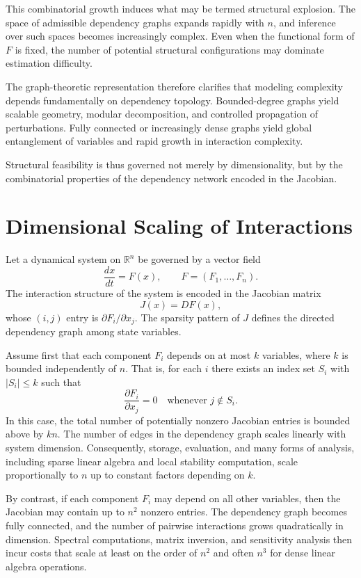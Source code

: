 \documentclass[12pt]{book}
\begin{document}
This combinatorial growth induces what may be termed structural explosion. The space of admissible dependency graphs expands rapidly with $n$, and inference over such spaces becomes increasingly complex. Even when the functional form of $F$ is fixed, the number of potential structural configurations may dominate estimation difficulty.

The graph-theoretic representation therefore clarifies that modeling complexity depends fundamentally on dependency topology. Bounded-degree graphs yield scalable geometry, modular decomposition, and controlled propagation of perturbations. Fully connected or increasingly dense graphs yield global entanglement of variables and rapid growth in interaction complexity.

Structural feasibility is thus governed not merely by dimensionality, but by the combinatorial properties of the dependency network encoded in the Jacobian.

\section{Dimensional Scaling of Interactions}

Let a dynamical system on $\mathbb{R}^n$ be governed by a vector field
\[
\frac{dx}{dt} = F(x),
\qquad
F = (F_1,\dots,F_n).
\]
The interaction structure of the system is encoded in the Jacobian matrix
\[
J(x) = D F(x),
\]
whose $(i,j)$ entry is $\partial F_i / \partial x_j$. The sparsity pattern of $J$ defines the directed dependency graph among state variables.

Assume first that each component $F_i$ depends on at most $k$ variables, where $k$ is bounded independently of $n$. That is, for each $i$ there exists an index set $S_i$ with $|S_i| \le k$ such that
\[
\frac{\partial F_i}{\partial x_j} = 0
\quad
\text{whenever } j \notin S_i.
\]
In this case, the total number of potentially nonzero Jacobian entries is bounded above by $kn$. The number of edges in the dependency graph scales linearly with system dimension. Consequently, storage, evaluation, and many forms of analysis, including sparse linear algebra and local stability computation, scale proportionally to $n$ up to constant factors depending on $k$.

By contrast, if each component $F_i$ may depend on all other variables, then the Jacobian may contain up to $n^2$ nonzero entries. The dependency graph becomes fully connected, and the number of pairwise interactions grows quadratically in dimension. Spectral computations, matrix inversion, and sensitivity analysis then incur costs that scale at least on the order of $n^2$ and often $n^3$ for dense linear algebra operations.
\end{document}
